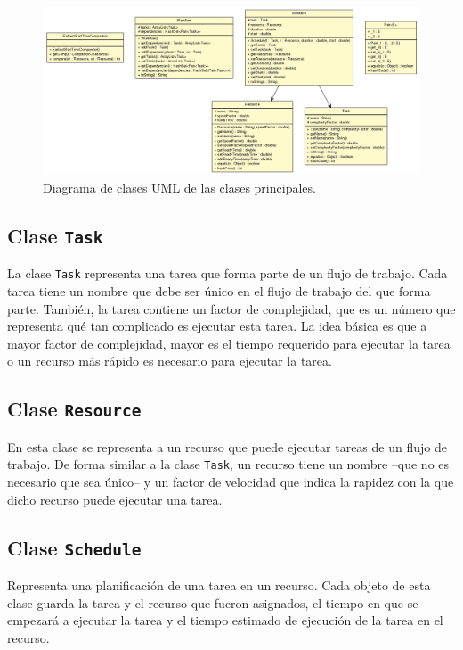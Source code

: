 \begin{figure}
\label{fig:uml_class}
\begin{center}
\includegraphics[width=1.0\textwidth]{imagenes/uml_class}
\end{center}
\caption{Diagrama de clases UML de las clases principales.}
\end{figure}

\subsection{Clase \texttt{Task}}
La clase \texttt{Task} representa una tarea que forma parte de un flujo de trabajo. Cada tarea tiene un nombre que debe ser único en el flujo de trabajo del que forma parte. También, la tarea contiene un factor de complejidad, que es un número que representa qué tan complicado es ejecutar esta tarea. La idea básica es que a mayor factor de complejidad, mayor es el tiempo requerido para ejecutar la tarea o un recurso más rápido es necesario para ejecutar la tarea. 

\subsection{Clase \texttt{Resource}}
En esta clase se representa a un recurso que puede ejecutar tareas de un flujo de trabajo. De forma similar a la clase \texttt{Task}, un recurso tiene un nombre --que no es necesario que sea único-- y un factor de velocidad que indica la rapidez con la que dicho recurso puede ejecutar una tarea.

\subsection{Clase \texttt{Schedule}}
Representa una planificación de una tarea en un recurso. Cada objeto de esta clase guarda la tarea y el recurso que fueron asignados, el tiempo en que se empezará a ejecutar la tarea y el tiempo estimado de ejecución de la tarea en el recurso.

